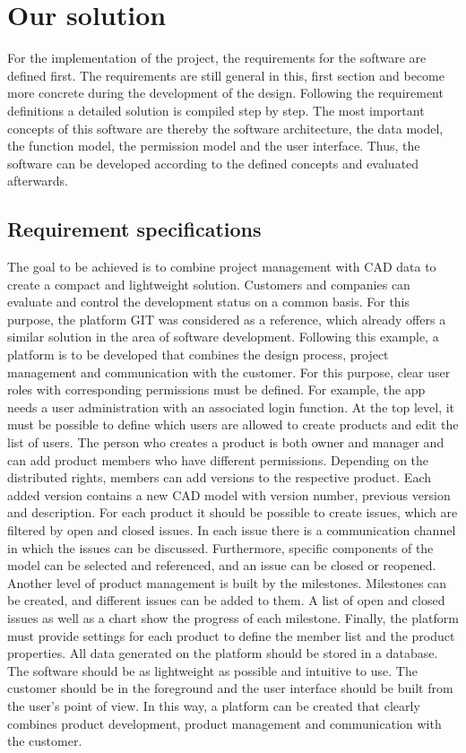 \section{Our solution}
    \label{sec:contribution}
    For the implementation of the project, the requirements for the software are defined first. The requirements are still general in this, first section and become more concrete during the development of the design. Following the requirement definitions a detailed solution is compiled step by step. The most important concepts of this software are thereby the software architecture, the data model, the function model, the permission model and the user interface. Thus, the software can be developed according to the defined concepts and evaluated afterwards.

    \subsection*{Requirement specifications}
    The goal to be achieved is to combine project management with CAD data to create a compact and lightweight solution. Customers and companies can evaluate and control the development status on a common basis. For this purpose, the platform GIT was considered as a reference, which already offers a similar solution in the area of software development. Following this example, a platform is to be developed that combines the design process, project management and communication with the customer. For this purpose, clear user roles with corresponding permissions must be defined. For example, the app needs a user administration with an associated login function. At the top level, it must be possible to define which users are allowed to create products and edit the list of users. The person who creates a product is both owner and manager and can add product members who have different permissions. Depending on the distributed rights, members can add versions to the respective product. Each added version contains a new CAD model with version number, previous version and description. For each product it should be possible to create issues, which are filtered by open and closed issues. In each issue there is a communication channel in which the issues can be discussed. Furthermore, specific components of the model can be selected and referenced, and an issue can be closed or reopened. Another level of product management is built by the milestones. Milestones can be created, and different issues can be added to them. A list of open and closed issues as well as a chart show the progress of each milestone. Finally, the platform must provide settings for each product to define the member list and the product properties. All data generated on the platform should be stored in a database. The software should be as lightweight as possible and intuitive to use. The customer should be in the foreground and the user interface should be built from the user's point of view. In this way, a platform can be created that clearly combines product development, product management and communication with the customer.

